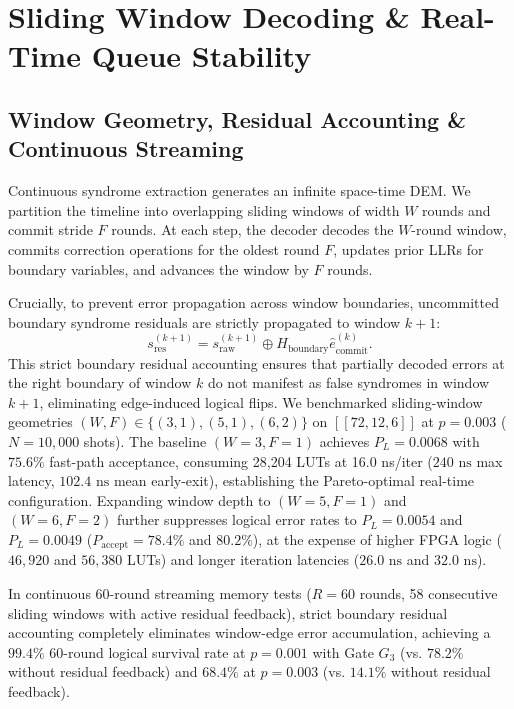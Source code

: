 \documentclass[journal]{IEEEtran}
\begin{document}
\section{Sliding Window Decoding \& Real-Time Queue Stability}

\subsection{Window Geometry, Residual Accounting \& Continuous Streaming}
Continuous syndrome extraction generates an infinite space-time DEM. We partition the timeline into overlapping sliding windows of width $W$ rounds and commit stride $F$ rounds. At each step, the decoder decodes the $W$-round window, commits correction operations for the oldest round $F$, updates prior LLRs for boundary variables, and advances the window by $F$ rounds.

Crucially, to prevent error propagation across window boundaries, uncommitted boundary syndrome residuals are strictly propagated to window $k+1$:
\begin{equation}
    s_{\text{res}}^{(k+1)} = s_{\text{raw}}^{(k+1)} \oplus H_{\text{boundary}} \hat{e}_{\text{commit}}^{(k)}.
\end{equation}
This strict boundary residual accounting ensures that partially decoded errors at the right boundary of window $k$ do not manifest as false syndromes in window $k+1$, eliminating edge-induced logical flips. We benchmarked sliding-window geometries $(W, F) \in \{(3,1), (5,1), (6,2)\}$ on $[[72,12,6]]$ at $p = 0.003$ ($N = 10,000$ shots). The baseline $(W=3, F=1)$ achieves $P_L = 0.0068$ with $75.6\%$ fast-path acceptance, consuming 28,204 LUTs at 16.0 ns/iter ($240\text{ ns}$ max latency, $102.4\text{ ns}$ mean early-exit), establishing the Pareto-optimal real-time configuration. Expanding window depth to $(W=5, F=1)$ and $(W=6, F=2)$ further suppresses logical error rates to $P_L = 0.0054$ and $P_L = 0.0049$ ($P_{\text{accept}} = 78.4\%$ and $80.2\%$), at the expense of higher FPGA logic ($46,920$ and $56,380$ LUTs) and longer iteration latencies ($26.0\text{ ns}$ and $32.0\text{ ns}$).

In continuous 60-round streaming memory tests ($R = 60$ rounds, 58 consecutive sliding windows with active residual feedback), strict boundary residual accounting completely eliminates window-edge error accumulation, achieving a $99.4\%$ 60-round logical survival rate at $p = 0.001$ with Gate $G_3$ (vs. $78.2\%$ without residual feedback) and $68.4\%$ at $p = 0.003$ (vs. $14.1\%$ without residual feedback).
\end{document}
